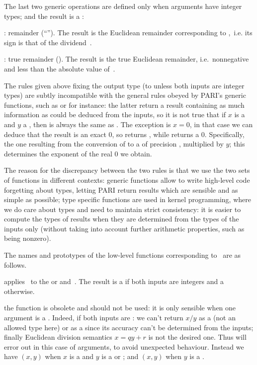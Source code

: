 The last two generic operations are defined only when arguments have integer
types; and the result is a :

\item {}: remainder (``''). The result is the Euclidean
remainder corresponding to ,~i.e. its sign is that of the
dividend~.

\item {}: true remainder (). The result is the true
Euclidean remainder, i.e.~nonnegative and less than the absolute value
of~.

 The rules given above fixing the output
type (to  unless both inputs are integer types) are subtly
incompatible with the general rules obeyed by PARI's generic functions, such
as  or  for instance: the latter return a result
containing as much information as could be deduced from the inputs, so it is
not true that if $x$ is a  and $y$ a , then
 is always the same as . The exception
is $x = 0$, in that case we can deduce that the result is an exact $0$,
so  returns , while  returns a
 $0$. Specifically, the one resulting from the conversion of
 to a  of precision , multiplied by
$y$; this determines the exponent of the real $0$ we obtain.

The reason for the discrepancy between the two rules is that we use the two
sets of functions in different contexts: generic functions allow to write
high-level code forgetting about types, letting PARI return results which are
sensible and as simple as possible; type specific functions are used in
kernel programming, where we do care about types and need to maintain strict
consistency: it is easier to compute the types of results when they are
determined from the types of the inputs only (without taking into account
further arithmetic properties, such as being nonzero).
\smallskip

The names and prototypes of the low-level functions corresponding
to \op\ are as follows.

 applies \op\ to
the  or   and~. The result is a 
if both inputs are integers and a  otherwise.

 the  function is obsolete
and should not be used: it is only sensible when one argument is a .
Indeed, if both inputs are  : we can't return $x/y$ as a 
(not an allowed type here) or as a  since its accuracy can't be
determined from the inputs; finally Euclidean division semantics $x = qy + r$
is not the desired one. Thus  will error out in this case of
 arguments, to avoid unexpected behaviour. Instead we have
$(x,y)$ when $x$ is a  and $y$ is a  or
; and $(x,y)$ when $y$ is a .


